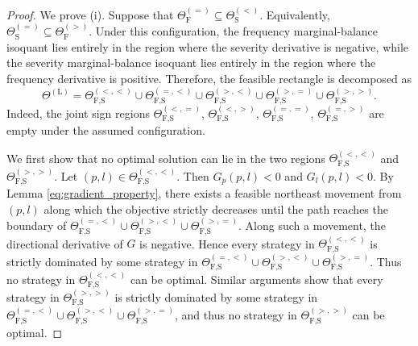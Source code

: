 \documentclass[a4paper,12pt]{article}
\begin{document}
\begin{proof}
We prove (i). Suppose that $\Theta_{\text{F}}^{\left(=\right)}\subseteq\Theta_{\text{S}}^{\left(<\right)}$. Equivalently, $\Theta_{\text{S}}^{\left(=\right)}\subseteq\Theta_{\text{F}}^{\left(>\right)}$. Under this configuration, the frequency marginal-balance isoquant lies entirely in the region where the severity derivative is negative, while the severity marginal-balance isoquant lies entirely in the region where the frequency derivative is positive. Therefore, the feasible rectangle is decomposed as
\begin{equation*}
\Theta^{\left(\text{L}\right)}=\Theta_{\text{F,S}}^{\left(<,<\right)}\cup\Theta_{\text{F,S}}^{\left(=,<\right)}\cup\Theta_{\text{F,S}}^{\left(>,<\right)}\cup\Theta_{\text{F,S}}^{\left(>,=\right)}\cup\Theta_{\text{F,S}}^{\left(>,>\right)}.
\end{equation*}
Indeed, the joint sign regions $\Theta_{\text{F,S}}^{\left(<,=\right)}$, $\Theta_{\text{F,S}}^{\left(<,>\right)}$, $\Theta_{\text{F,S}}^{\left(=,=\right)}$, $\Theta_{\text{F,S}}^{\left(=,>\right)}$ are empty under the assumed configuration.

We first show that no optimal solution can lie in the two regions $\Theta_{\text{F,S}}^{\left(<,<\right)}$ and $\Theta_{\text{F,S}}^{\left(>,>\right)}$. Let $\left(p,l\right)\in\Theta_{\text{F,S}}^{\left(<,<\right)}$. Then $G_p\left(p,l\right)<0$ and $G_l\left(p,l\right)<0$. By Lemma \ref{eq:gradient_property}, there exists a feasible northeast movement from $\left(p,l\right)$ along which the objective strictly decreases until the path reaches the boundary of $\Theta_{\text{F,S}}^{\left(=,<\right)}\cup\Theta_{\text{F,S}}^{\left(>,<\right)}\cup\Theta_{\text{F,S}}^{\left(>,=\right)}$. Along such a movement, the directional derivative of $G$ is negative. Hence every strategy in $\Theta_{\text{F,S}}^{\left(<,<\right)}$ is strictly dominated by some strategy in $\Theta_{\text{F,S}}^{\left(=,<\right)}\cup\Theta_{\text{F,S}}^{\left(>,<\right)}\cup\Theta_{\text{F,S}}^{\left(>,=\right)}$. Thus no strategy in $\Theta_{\text{F,S}}^{\left(<,<\right)}$ can be optimal. Similar arguments show that every strategy in $\Theta_{\text{F,S}}^{\left(>,>\right)}$ is strictly dominated by some strategy in $\Theta_{\text{F,S}}^{\left(=,<\right)}\cup\Theta_{\text{F,S}}^{\left(>,<\right)}\cup\Theta_{\text{F,S}}^{\left(>,=\right)}$, and thus no strategy in $\Theta_{\text{F,S}}^{\left(>,>\right)}$ can be optimal.


\end{proof}
\end{document}
